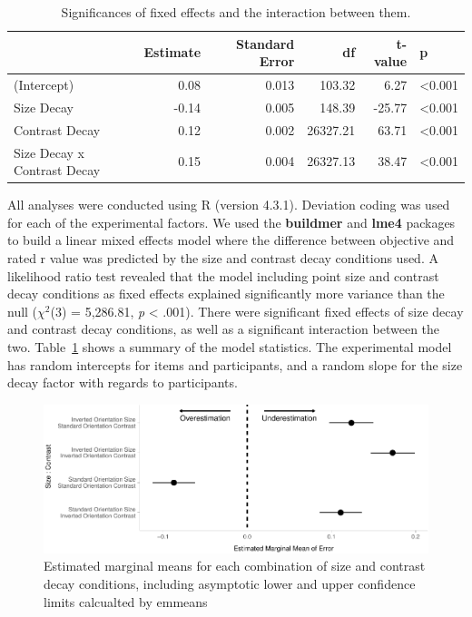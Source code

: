 \documentclass[manuscript, review, anonymous, screen]{acmart}
\begin{document}
\hypertarget{tbl-sig}{}
\begin{table}
\caption{\label{tbl-sig}Significances of fixed effects and the interaction between them. }\tabularnewline

\centering
\begin{tabular}{lrrrrl}
\toprule
  & Estimate & Standard Error & df & t-value & p\\
\midrule
(Intercept) & 0.08 & 0.013 & 103.32 & 6.27 & <0.001\\
Size Decay & -0.14 & 0.005 & 148.39 & -25.77 & <0.001\\
Contrast Decay & 0.12 & 0.002 & 26327.21 & 63.71 & <0.001\\
Size Decay x Contrast Decay & 0.15 & 0.004 & 26327.13 & 38.47 & <0.001\\
\bottomrule
\end{tabular}
\end{table}

All analyses were conducted using R (version 4.3.1). Deviation coding
was used for each of the experimental factors. We used the
\textbf{buildmer} and \textbf{lme4} packages to build a linear mixed
effects model where the difference between objective and rated r value
was predicted by the size and contrast decay conditions used. A
likelihood ratio test revealed that the model including point size and
contrast decay conditions as fixed effects explained significantly more
variance than the null (\(\chi^2\)(3) = 5,286.81, \emph{p} \textless{}
.001). There were significant fixed effects of size decay and contrast
decay conditions, as well as a significant interaction between the two.
Table~\ref{tbl-sig} shows a summary of the model statistics. The
experimental model has random intercepts for items and participants, and
a random slope for the size decay factor with regards to participants.

\begin{figure}

{\centering \includegraphics[width=1\textwidth,height=\textheight]{size_and_contrast_new_files/figure-pdf/fig-emm-plot-1.pdf}

}

\caption{\label{fig-emm-plot}Estimated marginal means for each
combination of size and contrast decay conditions, including asymptotic
lower and upper confidence limits calcualted by emmeans}

\end{figure}
\end{document}
